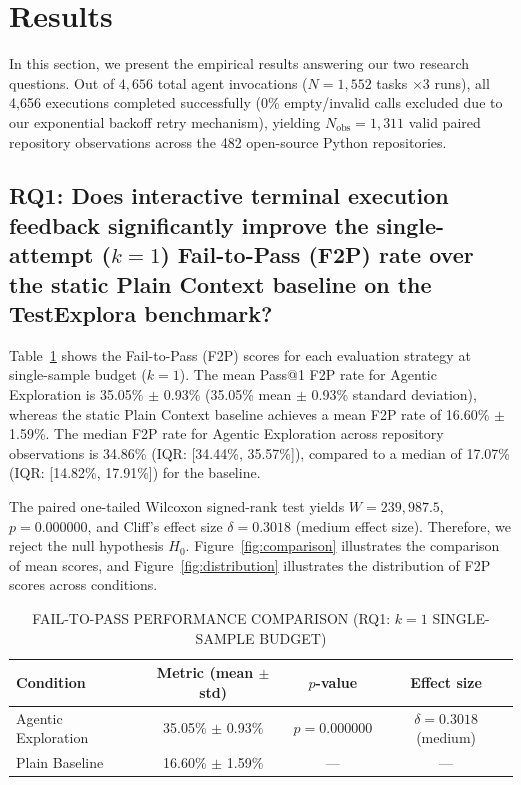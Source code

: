 \section{Results}
\label{sec:results}

In this section, we present the empirical results answering our two research questions. Out of $4,656$ total agent invocations ($N=1,552$ tasks $\times 3$ runs), all 4,656 executions completed successfully (0\% empty/invalid calls excluded due to our exponential backoff retry mechanism), yielding $N_{\text{obs}} = 1,311$ valid paired repository observations across the 482 open-source Python repositories.

\subsection{RQ1: Does interactive terminal execution feedback significantly improve the single-attempt ($k=1$) Fail-to-Pass (F2P) rate over the static Plain Context baseline on the TestExplora benchmark?}

Table~\ref{tab:rq1_results} shows the Fail-to-Pass (F2P) scores for each evaluation strategy at single-sample budget ($k=1$). The mean Pass@1 F2P rate for Agentic Exploration is 35.05\% $\pm$ 0.93\% (35.05\% mean $\pm$ 0.93\% standard deviation), whereas the static Plain Context baseline achieves a mean F2P rate of 16.60\% $\pm$ 1.59\%. The median F2P rate for Agentic Exploration across repository observations is 34.86\% (IQR: [34.44\%, 35.57\%]), compared to a median of 17.07\% (IQR: [14.82\%, 17.91\%]) for the baseline.

The paired one-tailed Wilcoxon signed-rank test yields $W = 239,987.5$, $p = 0.000000$, and Cliff's effect size $\delta = 0.3018$ (medium effect size). Therefore, we reject the null hypothesis $H_0$. Figure~\ref{fig:comparison} illustrates the comparison of mean scores, and Figure~\ref{fig:distribution} illustrates the distribution of F2P scores across conditions.

\begin{table}[htbp]
\caption{FAIL-TO-PASS PERFORMANCE COMPARISON (RQ1: $k=1$ SINGLE-SAMPLE BUDGET)}
\begin{center}
\begin{tabular}{|l|c|c|c|}
\hline
\textbf{Condition} & \textbf{Metric (mean $\pm$ std)} & \textbf{$p$-value} & \textbf{Effect size} \\
\hline
Agentic Exploration & 35.05\% $\pm$ 0.93\% & $p = 0.000000$ & $\delta = 0.3018$ (medium) \\
Plain Baseline & 16.60\% $\pm$ 1.59\% & --- & --- \\
\hline
\end{tabular}
\label{tab:rq1_results}
\end{center}
\end{table}

